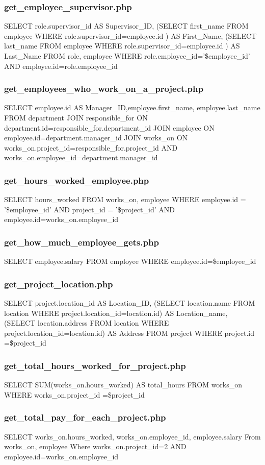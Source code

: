 \documentclass[11pt,letterpaper]{article}
\begin{document}
	\subsubsection{get\_employee\_supervisor.php}
	SELECT role.supervisor\_id AS Supervisor\_ID, (SELECT first\_name FROM employee WHERE role.supervisor\_id=employee.id ) AS First\_Name, (SELECT last\_name FROM employee WHERE role.supervisor\_id=employee.id ) AS Last\_Name FROM role, employee WHERE role.employee\_id='\$employee\_id' AND employee.id=role.employee\_id
	\subsubsection{get\_employees\_who\_work\_on\_a\_project.php}
	SELECT employee.id AS Manager\_ID,employee.first\_name, employee.last\_name FROM department JOIN responsible\_for ON department.id=responsible\_for.department\_id JOIN employee ON employee.id=department.manager\_id JOIN works\_on ON works\_on.project\_id=responsible\_for.project\_id AND works\_on.employee\_id=department.manager\_id
	\subsubsection{get\_hours\_worked\_employee.php}
	SELECT hours\_worked FROM works\_on, employee WHERE employee.id = '\$employee\_id' AND project\_id = '\$project\_id' AND employee.id=works\_on.employee\_id
	\subsubsection{get\_how\_much\_employee\_gets.php}
	SELECT employee.salary FROM employee WHERE employee.id=\$employee\_id
	\subsubsection{get\_project\_location.php}
	SELECT project.location\_id AS Location\_ID, (SELECT location.name FROM location WHERE project.location\_id=location.id) AS Location\_name, (SELECT location.address FROM location WHERE project.location\_id=location.id) AS Address FROM project WHERE project.id =\$project\_id
	\subsubsection{get\_total\_hours\_worked\_for\_project.php}
	SELECT SUM(works\_on.hours\_worked) AS total\_hours FROM works\_on WHERE works\_on.project\_id =\$project\_id
	\subsubsection{get\_total\_pay\_for\_each\_project.php}
	SELECT works\_on.hours\_worked, works\_on.employee\_id, employee.salary From works\_on, employee Where  works\_on.project\_id=2 AND employee.id=works\_on.employee\_id
\end{document}
